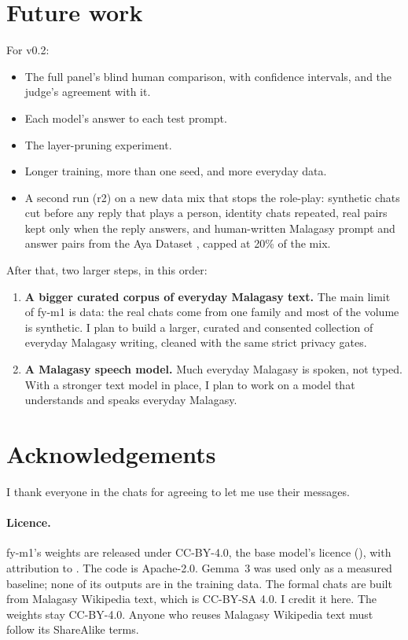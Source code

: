 \documentclass[11pt]{article}
\begin{document}
\section{Future work}
\label{sec:future}
For v0.2:
\begin{itemize}
  \item The full panel's blind human comparison, with confidence intervals, and the judge's agreement
        with it.
  \item Each model's answer to each test prompt.
  \item The layer-pruning experiment.
  \item Longer training, more than one seed, and more everyday data.
  \item A second run (r2) on a new data mix that stops the role-play: synthetic chats cut before any reply
        that plays a person, identity chats repeated, real pairs kept only when the reply answers, and
        human-written Malagasy prompt and answer pairs from the Aya Dataset \citep{singh2024aya}, capped at
        20\% of the mix.
\end{itemize}
After that, two larger steps, in this order:
\begin{enumerate}
  \item \textbf{A bigger curated corpus of everyday Malagasy text.} The main limit of fy-m1 is data: the
        real chats come from one family and most of the volume is synthetic. I plan to build a larger,
        curated and consented collection of everyday Malagasy writing, cleaned with the same strict
        privacy gates.
  \item \textbf{A Malagasy speech model.} Much everyday Malagasy is spoken, not typed. With a stronger
        text model in place, I plan to work on a model that understands and speaks everyday Malagasy.
\end{enumerate}

\section*{Acknowledgements}
\label{sec:ack}
I thank everyone in the chats for agreeing to let me use their messages.

\paragraph{Licence.} fy-m1's weights are released under CC-BY-4.0, the base model's licence
(\fyBaseLicense{}), with attribution to \citet{afriqueqwen}. The code is Apache-2.0. Gemma~3 was used only
as a measured baseline; none of its outputs are in the training data. The formal chats are built from
Malagasy Wikipedia text, which is CC-BY-SA 4.0. I credit it here. The weights stay CC-BY-4.0. Anyone who
reuses Malagasy Wikipedia text must follow its ShareAlike terms.
\end{document}

